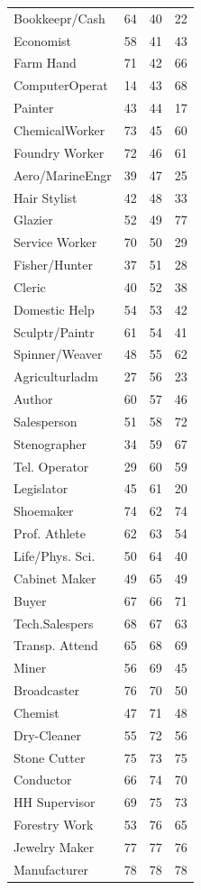 \begin{tabular}{lccc}
Bookkeepr/Cash&64&40&22\\
Economist&58&41&43\\
Farm Hand&71&42&66\\
ComputerOperat&14&43&68\\
Painter&43&44&17\\
ChemicalWorker&73&45&60\\
Foundry Worker&72&46&61\\
Aero/MarineEngr&39&47&25\\
Hair Stylist&42&48&33\\
Glazier&52&49&77\\
Service Worker&70&50&29\\
Fisher/Hunter&37&51&28\\
Cleric&40&52&38\\
Domestic Help&54&53&42\\
Sculptr/Paintr&61&54&41\\
Spinner/Weaver&48&55&62\\
Agriculturladm&27&56&23\\
Author&60&57&46\\
Salesperson&51&58&72\\
Stenographer&34&59&67\\
Tel. Operator&29&60&59\\
Legislator&45&61&20\\
Shoemaker&74&62&74\\
Prof. Athlete&62&63&54\\
Life/Phys. Sci.&50&64&40\\
Cabinet Maker&49&65&49\\
Buyer&67&66&71\\
Tech.Salespers&68&67&63\\
Transp. Attend&65&68&69\\
Miner&56&69&45\\
Broadcaster&76&70&50\\
Chemist&47&71&48\\
Dry-Cleaner&55&72&56\\
Stone Cutter&75&73&75\\
Conductor&66&74&70\\
HH Supervisor&69&75&73\\
Forestry Work&53&76&65\\
Jewelry Maker&77&77&76\\
Manufacturer&78&78&78\\
\hline\hline
\end{tabular}
